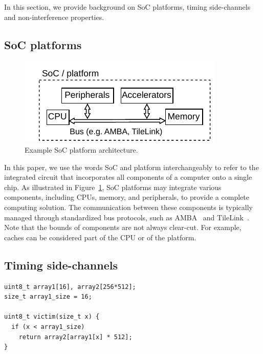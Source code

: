 In this section, we provide background on SoC platforms, timing side-channels and non-interference properties.

\subsection{SoC platforms}

\begin{figure}[t]
    \begin{center}
    \includegraphics[width=1\columnwidth]{figures/exampleplatform/exampleplatform.pdf}
    \end{center}
    \vspace*{-1em}
    \caption{\label{fig:exampleplatform}
        Example SoC platform architecture.
    }
    \vspace*{-1em}
\end{figure}

In this paper, we use the words SoC and platform interchangeably to refer to the integrated circuit that incorporates all components of a computer onto a single chip.
As illustrated in Figure~\ref{fig:exampleplatform}, SoC platforms may integrate various components, including CPUs, memory, and peripherals, to provide a complete computing solution.
The communication between these components is typically managed through standardized bus protocols, such as AMBA~\cite{arm_amba} and TileLink~\cite{tilelink_spec}.
Note that the bounds of components are not always clear-cut.
For example, caches can be considered part of the CPU or of the platform.


\subsection{Timing side-channels}

\begin{lstlisting}[caption={Minimal Spectre V1 transmitter example~\cite{kocher2019spectre}},label={lst:spectrev1}]
uint8_t array1[16], array2[256*512];
size_t array1_size = 16;

uint8_t victim(size_t x) {
  if (x < array1_size)
    return array2[array1[x] * 512];
}
\end{lstlisting}

